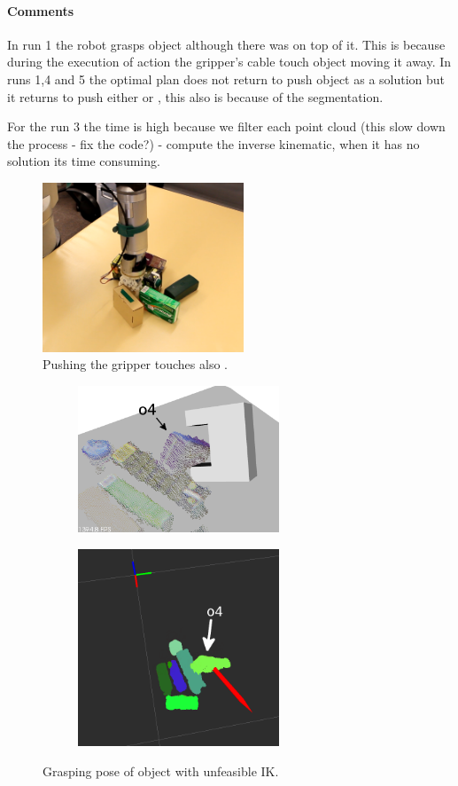 \paragraph{Comments}
In run 1 the robot grasps object  although there was  on top of it. This is because during the execution of   action the gripper's cable touch object  moving it away.  In runs 1,4 and 5 the optimal plan does not return to push object  as a solution but it returns to push either  or , this also is because of the segmentation. 


For the run 3 the time is high because we filter each point cloud (this slow down the process - fix the code?) - compute the inverse kinematic, when it has no solution its time consuming. 

\begin{figure}[tb]
\centering
\includegraphics[width=6cm]{Img/experiments/exp_good/pushing_o0c.png}
\caption{Pushing  the gripper touches also .}\label{fig:pushing_o0}
\end{figure}

\begin{figure}[tb]
\centering
\begin{subfigure}[t]{0.45\textwidth}
\centering
\includegraphics[width=6cm]{Img/experiments/exp_good/grasp_o4.png}
\end{subfigure}
\begin{subfigure}[t]{0.45\textwidth}
\centering
\includegraphics[width=6cm]{Img/experiments/exp_good/grasp_o4_rviz.png}
\end{subfigure}
\caption{Grasping pose of object  with unfeasible IK.}\label{fig:grasp_o4}
\end{figure}

